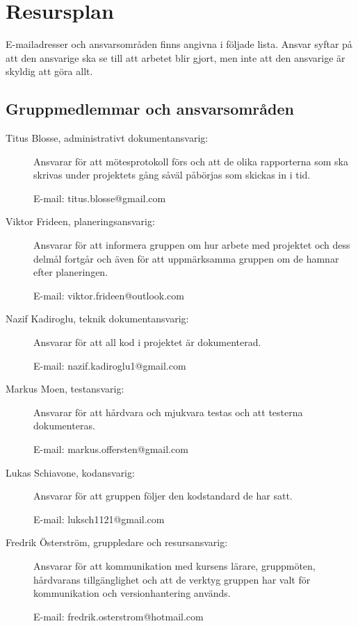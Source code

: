 \documentclass[a4paper]{article}
\begin{document}
\section{Resursplan}

E-mailadresser och ansvarsområden finns angivna i följade lista. Ansvar syftar på att den ansvarige ska se till att arbetet blir gjort, men inte att den ansvarige är skyldig att göra allt.

\subsection{Gruppmedlemmar och ansvarsområden}

\begin{description}
    \item[Titus Blosse, administrativt dokumentansvarig:] Ansvarar för att mötesprotokoll förs och att de olika rapporterna som ska skrivas under projektets gång såväl påbörjas som skickas in i tid.

    E-mail: titus.blosse@gmail.com

    \item[Viktor Frideen, planeringsansvarig:] Ansvarar för att informera gruppen om hur arbete med projektet och dess delmål fortgår och även för att uppmärksamma gruppen om de hamnar efter planeringen.

    E-mail: viktor.frideen@outlook.com

    \item[Nazif Kadiroglu, teknik dokumentansvarig:] Ansvarar för att all kod i projektet är dokumenterad.

    E-mail: nazif.kadiroglu1@gmail.com

    \item[Markus Moen, testansvarig:] Ansvarar för att hårdvara och mjukvara testas och att testerna dokumenteras.

    E-mail: markus.offersten@gmail.com

    \item[Lukas Schiavone, kodansvarig:] Ansvarar för att gruppen följer den kodstandard de har satt.

    E-mail: luksch1121@gmail.com

    \item[Fredrik Österström, gruppledare och resursansvarig:] Ansvarar för att kommunikation med kursens lärare, gruppmöten, hårdvarans tillgänglighet och att de verktyg gruppen har valt för kommunikation och versionhantering används.

    E-mail: fredrik.osterstrom@hotmail.com
\end{description}
\end{document}
